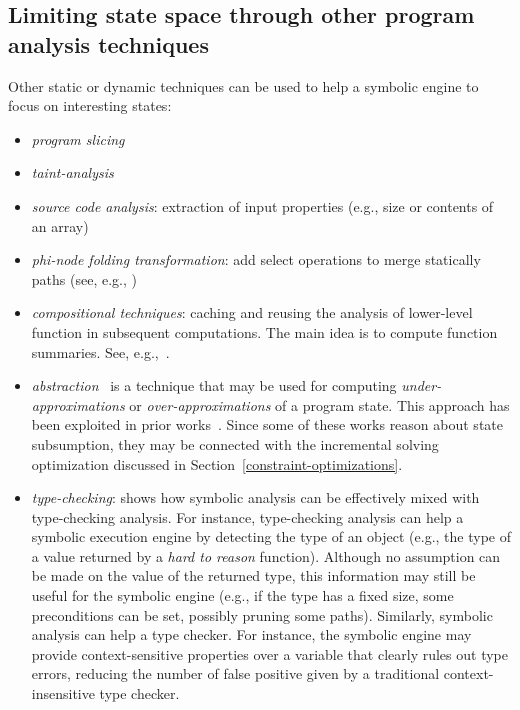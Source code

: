 \subsection{Limiting state space through other program analysis techniques}

Other static or dynamic techniques can be used to help a symbolic engine to focus on interesting states:
\begin{itemize}
  \item {\em program slicing}
  \item {\em taint-analysis}
  \item {\em source code analysis}: extraction of input properties (e.g., size or contents of an array)
  \item {\em phi-node folding transformation}: add select operations to merge statically paths (see, e.g., \cite{CCK-EUROSYS11})
  \item {\em compositional techniques}: caching and reusing the analysis of lower-level function in subsequent computations. The main idea is to compute function summaries. See, e.g.,~\cite{G-POPL07,G-PLDI11,MS-TR07}.
  \item {\em abstraction}~\cite{C-SEFM07} is a technique that may be used for computing {\em under-approximations} or {\em over-approximations} of a program state. This approach has been exploited in prior works~\cite{APV-SPIN06,VPP-ISSTA06,XGM-ISSTA08}. Since some of these works reason about state subsumption, they may be connected with the incremental solving optimization discussed in Section~\ref{constraint-optimizations}.
  \item {\em type-checking}: \cite{KCF-PLDI10} shows how symbolic analysis can be effectively mixed with type-checking analysis. For instance, type-checking analysis can help a symbolic execution engine by detecting the type of an object (e.g., the type of a value returned by a {\em hard to reason} function). Although no assumption can be made on the value of the returned type, this information may still be useful for the symbolic engine (e.g., if the type has a fixed size, some preconditions can be set, possibly pruning some paths). Similarly, symbolic analysis can help a type checker. For instance, the symbolic engine may provide context-sensitive properties over a variable that clearly rules out type errors, reducing the number of false positive given by a traditional context-insensitive type checker.
\end{itemize}

